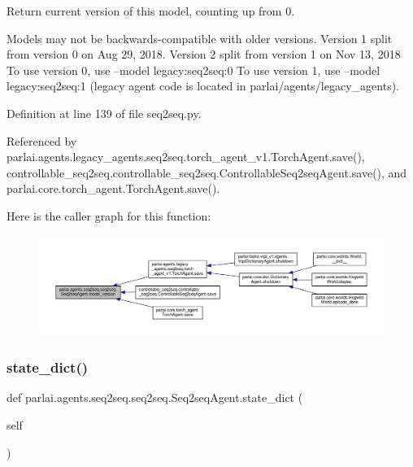 \begin{DoxyVerb}Return current version of this model, counting up from 0.

Models may not be backwards-compatible with older versions.
Version 1 split from version 0 on Aug 29, 2018.
Version 2 split from version 1 on Nov 13, 2018
To use version 0, use --model legacy:seq2seq:0
To use version 1, use --model legacy:seq2seq:1
(legacy agent code is located in parlai/agents/legacy_agents).
\end{DoxyVerb}
 

Definition at line 139 of file seq2seq.\+py.



Referenced by parlai.\+agents.\+legacy\+\_\+agents.\+seq2seq.\+torch\+\_\+agent\+\_\+v1.\+Torch\+Agent.\+save(), controllable\+\_\+seq2seq.\+controllable\+\_\+seq2seq.\+Controllable\+Seq2seq\+Agent.\+save(), and parlai.\+core.\+torch\+\_\+agent.\+Torch\+Agent.\+save().

Here is the caller graph for this function\+:
\nopagebreak
\begin{figure}[H]
\begin{center}
\leavevmode
\includegraphics[width=350pt]{classparlai_1_1agents_1_1seq2seq_1_1seq2seq_1_1Seq2seqAgent_aba4b52b4f15795eeda202cb303525483_icgraph}
\end{center}
\end{figure}
\mbox{\label{classparlai_1_1agents_1_1seq2seq_1_1seq2seq_1_1Seq2seqAgent_a7b68df3db0fcadb70a97a28ec2617cb2}} 
\subsubsection{\texorpdfstring{state\+\_\+dict()}{state\_dict()}}
{\footnotesize\ttfamily def parlai.\+agents.\+seq2seq.\+seq2seq.\+Seq2seq\+Agent.\+state\+\_\+dict (\begin{DoxyParamCaption}\item[{}]{self }\end{DoxyParamCaption})}

